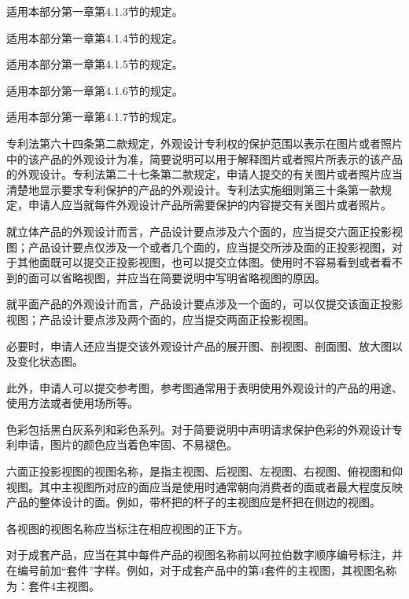 适用本部分第一章第4.1.3节的规定。

适用本部分第一章第4.1.4节的规定。

适用本部分第一章第4.1.5节的规定。

适用本部分第一章第4.1.6节的规定。

适用本部分第一章第4.1.7节的规定。

专利法第六十四条第二款规定，外观设计专利权的保护范围以表示在图片或者照片中的该产品的外观设计为准，简要说明可以用于解释图片或者照片所表示的该产品的外观设计。专利法第二十七条第二款规定，申请人提交的有关图片或者照片应当清楚地显示要求专利保护的产品的外观设计。专利法实施细则第三十条第一款规定，申请人应当就每件外观设计产品所需要保护的内容提交有关图片或者照片。

就立体产品的外观设计而言，产品设计要点涉及六个面的，应当提交六面正投影视图；产品设计要点仅涉及一个或者几个面的，应当提交所涉及面的正投影视图，对于其他面既可以提交正投影视图，也可以提交立体图。使用时不容易看到或者看不到的面可以省略视图，并应当在简要说明中写明省略视图的原因。

就平面产品的外观设计而言，产品设计要点涉及一个面的，可以仅提交该面正投影视图；产品设计要点涉及两个面的，应当提交两面正投影视图。

必要时，申请人还应当提交该外观设计产品的展开图、剖视图、剖面图、放大图以及变化状态图。

此外，申请人可以提交参考图，参考图通常用于表明使用外观设计的产品的用途、使用方法或者使用场所等。

色彩包括黑白灰系列和彩色系列。对于简要说明中声明请求保护色彩的外观设计专利申请，图片的颜色应当着色牢固、不易褪色。

六面正投影视图的视图名称，是指主视图、后视图、左视图、右视图、俯视图和仰视图。其中主视图所对应的面应当是使用时通常朝向消费者的面或者最大程度反映产品的整体设计的面。例如，带杯把的杯子的主视图应是杯把在侧边的视图。

各视图的视图名称应当标注在相应视图的正下方。

对于成套产品，应当在其中每件产品的视图名称前以阿拉伯数字顺序编号标注，并在编号前加“套件”字样。例如，对于成套产品中的第4套件的主视图，其视图名称为：套件4主视图。

